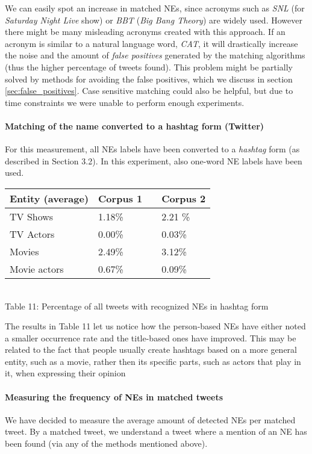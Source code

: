 We can easily spot an increase in matched NEs, since acronyms such as \textit{SNL}
(for \textit{Saturday Night Live} show) or \textit{BBT} (\textit{Big Bang Theory}) are widely used.
However there might be many misleading acronyms created with this approach. If an acronym is similar
to a natural language word, \eg \textit{CAT}, it will drastically increase the noise and the amount
of \textit{false positives} generated by the matching algorithms (thus the higher percentage of tweets
found). This problem might be partially solved by methods for avoiding the false positives,
which we discuss in section \ref{sec:false_positives}. Case sensitive matching could also be helpful,
but due to time constraints we were unable to perform enough experiments.

\paragraph{Matching of the name converted to a hashtag form (Twitter)}
For this measurement, all NEs labels have been converted to a \textit{hashtag} form (as described
in Section 3.2). In this experiment, also one-word NE labels have been used.

\begin{center}
  \begin{tabular}{ | p{4cm} | p{2cm} | p{1cm}| p{2cm} | } \hline
    Entity (average) & Corpus 1 & & Corpus 2 \\ \hline
    TV Shows & 1.18\% & & 2.21 \% \\ \hline
    TV Actors & 0.00\% & & 0.03\% \\ \hline
    Movies & 2.49\% & & 3.12\% \\ \hline
    Movie actors & 0.67\% & & 0.09\% \\ \hline
  \end{tabular} \\
  Table 11: Percentage of all tweets with recognized NEs in hashtag form \\
\end{center}

The results in Table 11 let us notice how the person-based NEs have either noted a smaller
occurrence rate and the title-based ones have improved. This may be related to the
fact that people usually create hashtags based on a more general entity, such as
a movie, rather then its specific parts, such as actors that play in it,
when expressing their opinion \cite{edinburg-corpus}

\paragraph{Measuring the frequency of NEs in matched tweets}
We have decided to measure the average amount of detected NEs per matched tweet. By a matched tweet,
we understand a tweet where a mention of an NE has been found (via any of the methods mentioned above).

